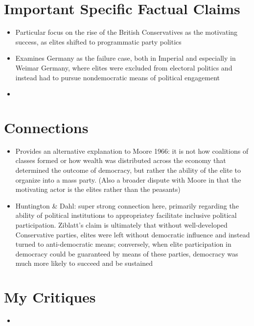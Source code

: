 \documentclass[12pt]{article}
\begin{document}
\section{Important Specific Factual Claims}

\begin{itemize}[leftmargin=*, itemsep=4pt]
    \item Particular focus on the rise of the British Conservatives as the motivating success, as elites shifted to programmatic party politics
    \item Examines Germany as the failure case, both in Imperial and especially in Weimar Germany, where elites were excluded from electoral politics and instead had to pursue nondemocratic means of political engagement
    \item 
\end{itemize}


\section{Connections}

\begin{itemize}[leftmargin=*, itemsep=4pt]
    \item Provides an alternative explanation to Moore 1966: it is not how coalitions of classes formed or how wealth was distributed across the economy that determined the outcome of democracy, but rather the ability of the elite to organize into a mass party. (Also a broader dispute with Moore in that the motivating actor is the elites rather than the peasants)
    \item Huntington \& Dahl: super strong connection here, primarily regarding the ability of political institutions to appropriatey facilitate inclusive political participation. Ziblatt's claim is ultimately that without well-developed Conservative parties, elites were left without democratic influence and instead turned to anti-democratic means; conversely, when elite participation in democracy could be guaranteed by means of these parties, democracy was much more likely to succeed and be sustained
\end{itemize}


\section{My Critiques}

\begin{itemize}[leftmargin=*, itemsep=4pt]
    \item
\end{itemize}
\end{document}
